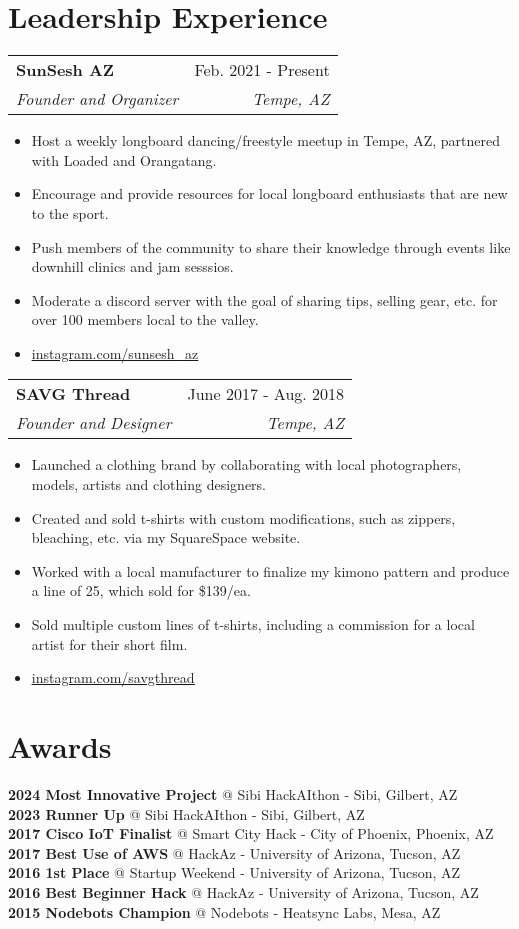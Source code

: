 \documentclass[letterpaper,11pt]{article}
\makeatletter
\newcommand{\resumeItem}[1]{
  \item\small{
    {#1 \vspace{-2pt}}
  }
}
\newcommand{\resumeSubheading}[4]{
  \vspace{-2pt}\item
    \begin{tabular*}{0.97\textwidth}[t]{l@{\extracolsep{\fill}}r}
      \textbf{#1} & #2 \\
      \textit{\small#3} & \textit{\small #4} \\
    \end{tabular*}\vspace{-7pt}
}
\newcommand{\resumeItemListStart}{\begin{itemize}}
\newcommand{\resumeItemListEnd}{\end{itemize}\vspace{-5pt}}
\makeatother
\begin{document}
\section{Leadership Experience}
\begin{itemize}[leftmargin=0.15in, label={}]
   \small{\item{
    \resumeSubheading
      {SunSesh AZ}{Feb. 2021 - Present}
      {Founder and Organizer}{Tempe, AZ}
      \resumeItemListStart
        \resumeItem{Host a weekly longboard dancing/freestyle meetup in Tempe, AZ, partnered with Loaded and Orangatang.}
        \resumeItem{Encourage and provide resources for local longboard enthusiasts that are new to the sport.}
        \resumeItem{Push members of the community to share their knowledge through events like downhill clinics and jam sesssios.}
        \resumeItem{Moderate a discord server with the goal of sharing tips, selling gear, etc. for over 100 members local to the valley.}
        \resumeItem{\href{https://www.instagram.com/...}{\underline{instagram.com/sunsesh\_az}}}
      \resumeItemListEnd
    \resumeSubheading
      {SAVG Thread}{June 2017 - Aug. 2018}
      {Founder and Designer}{Tempe, AZ}
      \resumeItemListStart
        \resumeItem{Launched a clothing brand by collaborating with local photographers, models, artists and clothing designers.}
        \resumeItem{Created and sold t-shirts with custom modifications, such as zippers, bleaching, etc. via my SquareSpace website.}
        \resumeItem{Worked with a local manufacturer to finalize my kimono pattern and produce a line of 25, which sold for \$139/ea.}
        \resumeItem{Sold multiple custom lines of t-shirts, including a commission for a local artist for their short film.}
        \resumeItem{\href{https://www.instagram.com/...}{\underline{instagram.com/savgthread}}}
      \resumeItemListEnd
   }}
\end{itemize}

%
\section{Awards}
\begin{itemize}[leftmargin=0.15in, label={}]
   \small{\item{
    \textbf{2024 Most Innovative Project}{ @ Sibi HackAIthon - Sibi, Gilbert, AZ} \\
    \textbf{2023 Runner Up}{ @ Sibi HackAIthon - Sibi, Gilbert, AZ} \\
    \textbf{2017 Cisco IoT Finalist}{ @ Smart City Hack - City of Phoenix, Phoenix, AZ} \\
    \textbf{2017 Best Use of AWS}{ @ HackAz - University of Arizona, Tucson, AZ} \\
    \textbf{2016 1st Place}{ @ Startup Weekend - University of Arizona, Tucson, AZ} \\
    \textbf{2016 Best Beginner Hack}{ @ HackAz - University of Arizona, Tucson, AZ} \\
    \textbf{2015 Nodebots Champion}{ @ Nodebots - Heatsync Labs, Mesa, AZ} \\
   }}
\end{itemize}

\end{document}
